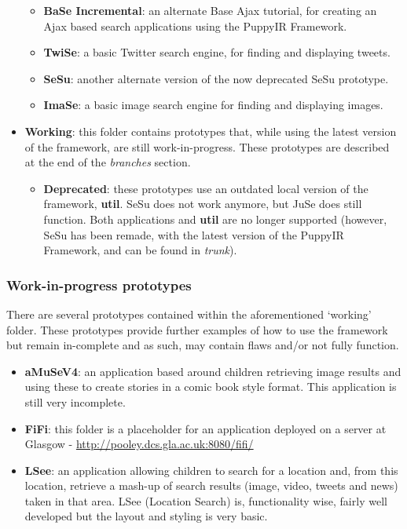 \documentclass[letterpaper,10pt,english]{sphinxmanual}
\begin{document}
\begin{itemize}
\begin{itemize}
\item {} 
\textbf{BaSe Incremental}: an alternate Base Ajax tutorial, for creating an Ajax based search applications using the PuppyIR Framework.

\item {} 
\textbf{TwiSe}: a basic Twitter search engine, for finding and displaying tweets.

\item {} 
\textbf{SeSu}: another alternate version of the now deprecated SeSu prototype.

\item {} 
\textbf{ImaSe}: a basic image search engine for finding and displaying images.

\end{itemize}

\item {} 
\textbf{Working}: this folder contains prototypes that, while using the latest version of the framework, are still work-in-progress. These prototypes are described at the end of the \emph{branches} section.
\begin{itemize}
\item {} 
\textbf{Deprecated}: these prototypes use an outdated local version of the framework, \textbf{util}. SeSu does not work anymore, but JuSe does still function. Both applications and \textbf{util} are no longer supported (however, SeSu has been remade, with the latest version of the PuppyIR Framework, and can be found in \emph{trunk}).

\end{itemize}

\end{itemize}


\subsubsection{Work-in-progress prototypes}
\label{repo:work-in-progress-prototypes}
There are several prototypes contained within the aforementioned `working' folder. These prototypes provide further examples of how to use the framework but remain in-complete and as such, may contain flaws and/or not fully function.
\begin{itemize}
\item {} 
\textbf{aMuSeV4}: an application based around children retrieving image results and using these to create stories in a comic book style format. This application is still very incomplete.

\item {} 
\textbf{FiFi}: this folder is a placeholder for an application deployed on a server at Glasgow - \href{http://pooley.dcs.gla.ac.uk:8080/fifi/}{http://pooley.dcs.gla.ac.uk:8080/fifi/}

\item {} 
\textbf{LSee}: an application allowing children to search for a location and, from this location, retrieve a mash-up of search results (image, video, tweets and news) taken in that area. LSee (Location Search) is, functionality wise, fairly well developed but the layout and styling is very basic.

\end{itemize}
\end{document}
